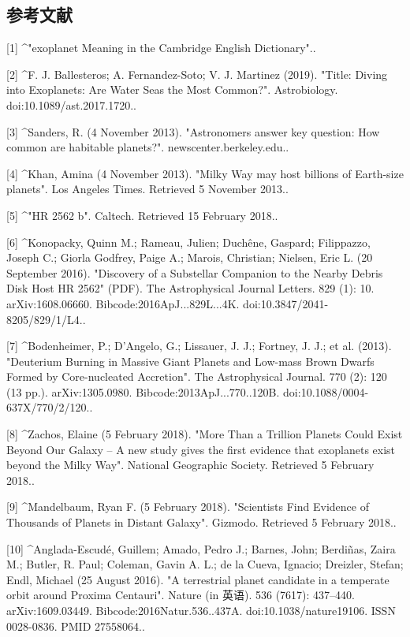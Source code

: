 \subsection{参考文献}
[1]
^"exoplanet Meaning in the Cambridge English Dictionary"..

[2]
^F. J. Ballesteros; A. Fernandez-Soto; V. J. Martinez (2019). "Title: Diving into Exoplanets: Are Water Seas the Most Common?". Astrobiology. doi:10.1089/ast.2017.1720..

[3]
^Sanders, R. (4 November 2013). "Astronomers answer key question: How common are habitable planets?". newscenter.berkeley.edu..

[4]
^Khan, Amina (4 November 2013). "Milky Way may host billions of Earth-size planets". Los Angeles Times. Retrieved 5 November 2013..

[5]
^"HR 2562 b". Caltech. Retrieved 15 February 2018..

[6]
^Konopacky, Quinn M.; Rameau, Julien; Duchêne, Gaspard; Filippazzo, Joseph C.; Giorla Godfrey, Paige A.; Marois, Christian; Nielsen, Eric L. (20 September 2016). "Discovery of a Substellar Companion to the Nearby Debris Disk Host HR 2562" (PDF). The Astrophysical Journal Letters. 829 (1): 10. arXiv:1608.06660. Bibcode:2016ApJ...829L...4K. doi:10.3847/2041-8205/829/1/L4..

[7]
^Bodenheimer, P.; D'Angelo, G.; Lissauer, J. J.; Fortney, J. J.; et al. (2013). "Deuterium Burning in Massive Giant Planets and Low-mass Brown Dwarfs Formed by Core-nucleated Accretion". The Astrophysical Journal. 770 (2): 120 (13 pp.). arXiv:1305.0980. Bibcode:2013ApJ...770..120B. doi:10.1088/0004-637X/770/2/120..

[8]
^Zachos, Elaine (5 February 2018). "More Than a Trillion Planets Could Exist Beyond Our Galaxy – A new study gives the first evidence that exoplanets exist beyond the Milky Way". National Geographic Society. Retrieved 5 February 2018..

[9]
^Mandelbaum, Ryan F. (5 February 2018). "Scientists Find Evidence of Thousands of Planets in Distant Galaxy". Gizmodo. Retrieved 5 February 2018..

[10]
^Anglada-Escudé, Guillem; Amado, Pedro J.; Barnes, John; Berdiñas, Zaira M.; Butler, R. Paul; Coleman, Gavin A. L.; de la Cueva, Ignacio; Dreizler, Stefan; Endl, Michael (25 August 2016). "A terrestrial planet candidate in a temperate orbit around Proxima Centauri". Nature (in 英语). 536 (7617): 437–440. arXiv:1609.03449. Bibcode:2016Natur.536..437A. doi:10.1038/nature19106. ISSN 0028-0836. PMID 27558064..

